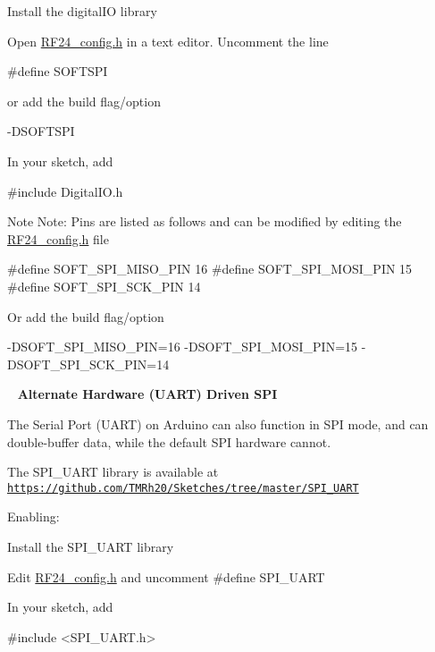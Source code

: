 \begin{DoxyEnumerate}
\item Install the digital\+IO library~\newline

\item Open \hyperlink{RF24__config_8h}{R\+F24\+\_\+config.\+h} in a text editor. Uncomment the line 
\begin{DoxyCode}
\textcolor{preprocessor}{#define SOFTSPI}
\end{DoxyCode}
 or add the build flag/option 
\begin{DoxyCode}
-DSOFTSPI
\end{DoxyCode}

\item In your sketch, add 
\begin{DoxyCode}
\textcolor{preprocessor}{#include DigitalIO.h}
\end{DoxyCode}

\end{DoxyEnumerate}

\begin{DoxyNote}{Note}
Note\+: Pins are listed as follows and can be modified by editing the \hyperlink{RF24__config_8h}{R\+F24\+\_\+config.\+h} file~\newline
 \begin{DoxyVerb}#define SOFT_SPI_MISO_PIN 16
#define SOFT_SPI_MOSI_PIN 15
#define SOFT_SPI_SCK_PIN 14
\end{DoxyVerb}
 Or add the build flag/option \begin{DoxyVerb}-DSOFT_SPI_MISO_PIN=16 -DSOFT_SPI_MOSI_PIN=15 -DSOFT_SPI_SCK_PIN=14
\end{DoxyVerb}

\end{DoxyNote}
~\newline
 {\bfseries Alternate Hardware (U\+A\+RT) Driven S\+PI}

The Serial Port (U\+A\+RT) on Arduino can also function in S\+PI mode, and can double-\/buffer data, while the default S\+PI hardware cannot.

The S\+P\+I\+\_\+\+U\+A\+RT library is available at \href{https://github.com/TMRh20/Sketches/tree/master/SPI_UART}{\tt https\+://github.\+com/\+T\+M\+Rh20/\+Sketches/tree/master/\+S\+P\+I\+\_\+\+U\+A\+RT}

Enabling\+:
\begin{DoxyEnumerate}
\item Install the S\+P\+I\+\_\+\+U\+A\+RT library
\item Edit \hyperlink{RF24__config_8h}{R\+F24\+\_\+config.\+h} and uncomment \#define S\+P\+I\+\_\+\+U\+A\+RT
\item In your sketch, add
\begin{DoxyCode}
\textcolor{preprocessor}{#include <SPI\_UART.h>} 
\end{DoxyCode}

\end{DoxyEnumerate}

